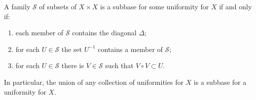 A family $\mathcal{S}$ of subsets of $X \times X$ is a subbase for some uniformity for $X$ if and only if:
\begin{enumerate}
\item[(a)] each member of $\mathcal{S}$ contains the diagonal $\Delta$;
\item[(b)] for each $U \in \mathcal{S}$ the set $U^{-1}$ contains a member of $\mathcal{S}$;
\item[(c)] for each $U \in \mathcal{S}$ there is $V \in \mathcal{S}$ such that $V \circ V \subset U$.
\end{enumerate}
In particular, the union of any collection of uniformities for $X$ is a subbase for a uniformity for $X$.
